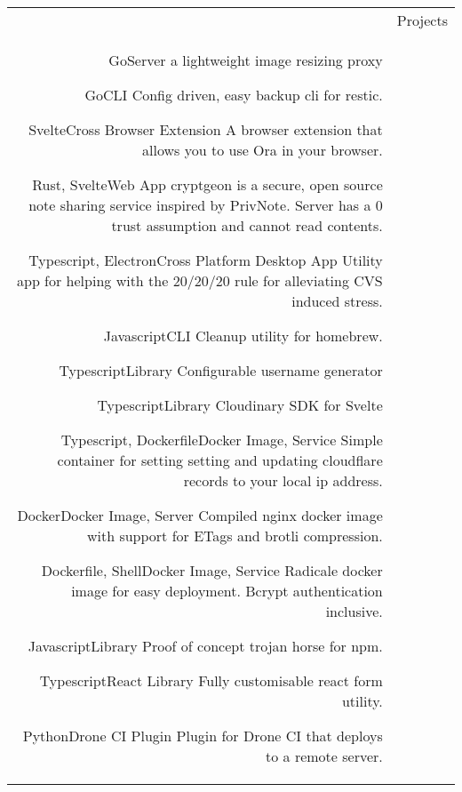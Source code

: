 \documentclass[letterpaper,12pt]{article}
\newcommand{\headingfont}{\Large\color{OliveGreen}\BluuNext}
\newenvironment{SectionTable}[1]{
	\renewcommand*{\arraystretch}{1.7}
	\setlength{\tabcolsep}{10pt}
	\begin{longtable}{Rp{5.2in}} & #1 \\}
{\end{longtable}\vspace{-.3cm}}
\begin{document}
\begin{SectionTable}{\headingfont Projects}

  {Go}{Server}
  {
    a lightweight image resizing proxy
  }

  {Go}{CLI}
  {
    Config driven, easy backup cli for restic.
  }

  {Svelte}{Cross Browser Extension}
  {
    A browser extension that allows you to use Ora in your browser.
  }

  {Rust, Svelte}{Web App}{
    cryptgeon is a secure, open source note sharing service inspired by PrivNote. Server has a 0 trust assumption and cannot read contents.
  }

  {Typescript, Electron}{Cross Platform Desktop App}{
    Utility app for helping with the 20/20/20 rule for alleviating CVS induced stress.
  }

  {Javascript}{CLI}{
    Cleanup utility for homebrew.
  }

  {Typescript}{Library}{
    Configurable username generator
  }

  {Typescript}{Library}{
    Cloudinary SDK for Svelte
  }

  {Typescript, Dockerfile}{Docker Image, Service}{
    Simple container for setting setting and updating cloudflare records to your local ip address.
  }

  {Docker}{Docker Image, Server}{
    Compiled nginx docker image with support for ETags and brotli compression.
  }

  {Dockerfile, Shell}{Docker Image, Service}{
    Radicale docker image for easy deployment. Bcrypt authentication inclusive.
  }

  {Javascript}{Library}{
    Proof of concept trojan horse for npm.
  }

  {Typescript}{React Library}{
    Fully customisable react form utility.
  }

  {Python}{Drone CI Plugin}{
    Plugin for Drone CI that deploys to a remote server.
  }
\end{SectionTable}
\end{document}
